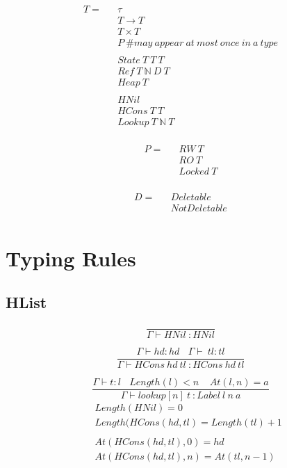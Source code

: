 \documentclass{article}
\begin{document}
\begin{eqnarray*}
 T = &&\tau                      \\ 
     &&T \to T                   \\ 
     &&T \times T                \\ 
     &&P\ \#may\ appear\ at\ most\ once\ in\ a\ type \\ 
     &&                          \\ 
     &&State\ T\ T\ T            \\ 
     &&Ref\ T\ {\mathbb N}\ D\ T \\ 
     &&Heap\ T                   \\ 
     &&                          \\
     &&HNil                      \\ 
     &&HCons\ T\ T               \\ 
     &&Lookup\ T\ {\mathbb N}\ T \\
\end{eqnarray*}

\begin{eqnarray*}
 P = &&RW\ T                     \\ 
     &&RO\ T                     \\ 
     &&Locked\ T                 \\ 
\end{eqnarray*}

\begin{eqnarray*}
 D = &&Deletable                 \\ 
     &&NotDeletable              \\ 
\end{eqnarray*}


\section{Typing Rules}

\subsection{HList}

$$\frac{}
		{\Gamma \vdash HNil\ :HNil}$$

$$\frac{\Gamma \vdash hd:hd\ \ \ \ \Gamma \vdash \ tl:tl}
		{\Gamma \vdash HCons\ hd\ tl\ :HCons\ hd\ tl}$$

$$\frac{\Gamma \vdash t:l \ \ \ \ Length(l)<n\ \ \ \ \ At(l,n)=a}
		{\Gamma \vdash lookup[n]\ t\ :Label\ l\ n\ a}$$
\begin{eqnarray*}
	&&Length(HNil)=0 			\\ 
	&&Length(HCons\left(hd,tl\right) = Length\left(tl\right)+1 				\\ 
									    \\ 
	&&At\left(HCons\left(hd,tl\right),0\right)=hd \\ 
	&&At(HCons\left(hd,tl\right),n)=At(tl,n-1)
\end{eqnarray*}
\end{document}
